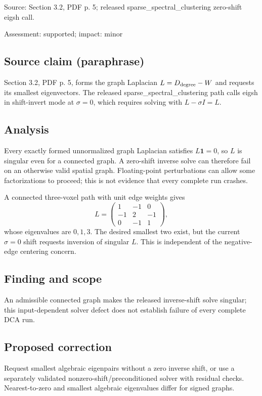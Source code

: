 \documentclass[11pt]{article}
\begin{document}
Source: Section 3.2, PDF p. 5; released sparse\_spectral\_clustering zero-shift eigsh call.

Assessment: supported; impact: minor

\subsection*{Source claim (paraphrase)}

Section 3.2, PDF p. 5, forms the graph Laplacian \(L=D_{\rm degree}-W\) and requests its smallest eigenvectors. The released sparse\_spectral\_clustering path calls eigsh in shift-invert mode at \(\sigma=0\), which requires solving with \(L-\sigma I=L\).

\subsection*{Analysis}

Every exactly formed unnormalized graph Laplacian satisfies \(L\mathbf1=0\), so \(L\) is singular even for a connected graph. A zero-shift inverse solve can therefore fail on an otherwise valid spatial graph. Floating-point perturbations can allow some factorizations to proceed; this is not evidence that every complete run crashes.

A connected three-voxel path with unit edge weights gives \[L=\begin{pmatrix}1&-1&0\\-1&2&-1\\0&-1&1\end{pmatrix},\] whose eigenvalues are \(0,1,3\). The desired smallest two exist, but the current \(\sigma=0\) shift requests inversion of singular \(L\). This is independent of the negative-edge centering concern.

\subsection*{Finding and scope}

An admissible connected graph makes the released inverse-shift solve singular; this input-dependent solver defect does not establish failure of every complete DCA run.

\subsection*{Proposed correction}

Request smallest algebraic eigenpairs without a zero inverse shift, or use a separately validated nonzero-shift/preconditioned solver with residual checks. Nearest-to-zero and smallest algebraic eigenvalues differ for signed graphs.
\end{document}
